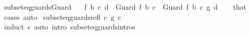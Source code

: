 \begin{isabellebody}
\isanewline
{}\isamarkupfalse%
\ subseteq{\isacharunderscore}guards{\isacharunderscore}Guard{\isacharprime}{\isacharcolon}\ \isanewline
\ \ {\isachardoublequoteopen}{\isasymexists}f{\isacharprime}\ b{\isacharprime}\ c{\isacharprime}{\isachardot}\ d\ {\isacharequal}\ Guard\ f{\isacharprime}\ b{\isacharprime}\ c{\isacharprime}{\isachardoublequoteclose}\ \ {\isachardoublequoteopen}Guard\ f\ b\ c\ {\isasymsubseteq}\isactrlsub g\ d{\isachardoublequoteclose}\isanewline
%
\isadelimproof
\ \ %
\endisadelimproof
%
\isatagproof
{}\isamarkupfalse%
\ that\ \isamarkupfalse%
\ cases\ auto%
\endisatagproof
{\isafoldproof}%
%
\isadelimproof
\isanewline
%
\endisadelimproof
\isanewline
{}\isamarkupfalse%
\ subseteq{\isacharunderscore}guards{\isacharunderscore}refl{\isacharcolon}\ {\isachardoublequoteopen}c\ {\isasymsubseteq}\isactrlsub g\ c{\isachardoublequoteclose}\isanewline
%
\isadelimproof
\ \ %
\endisadelimproof
%
\isatagproof
{}\isamarkupfalse%
\ {\isacharparenleft}induct\ c{\isacharparenright}\ {\isacharparenleft}auto\ intro{\isacharcolon}\ subseteq{\isacharunderscore}guards{\isachardot}intros{\isacharparenright}%
\endisatagproof
{\isafoldproof}%
%
\isadelimproof
\isanewline
%
\endisadelimproof
\isanewline
\isanewline
%
\isadelimtheory
\isanewline
%
\endisadelimtheory
%
\isatagtheory
{}\isamarkupfalse%
%
\endisatagtheory
{\isafoldtheory}%
%
\isadelimtheory
%
\endisadelimtheory
%
\end{isabellebody}%

